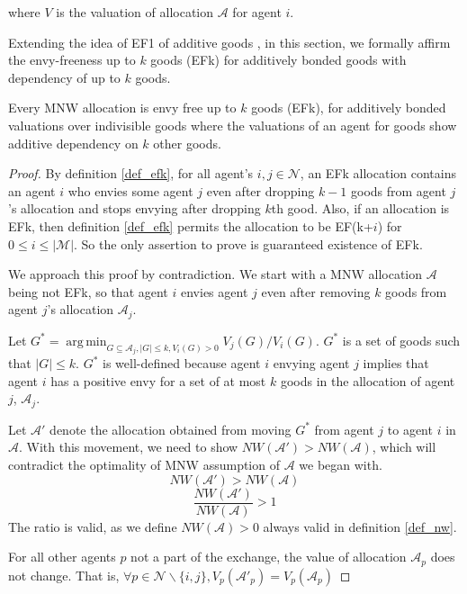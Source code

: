 where $V$ is the valuation of allocation $\mathcal{A}$ for agent $i$. 

Extending the idea of EF1 of additive goods \cite{caragiannis2016unreasonable}, in this section, we formally affirm the envy-freeness up to $k$ goods (EFk) for additively bonded goods with dependency of up to $k$ goods.

\begin{theorem}
Every MNW allocation is envy free up to $k$ goods (EFk), for additively bonded valuations over indivisible goods where the valuations of an agent for goods show additive dependency on $k$ other goods.
\end{theorem}

\begin{proof}
By definition \ref{def_efk}, for all agent's $i, j \in \mathcal{N}$, an EFk allocation contains an agent $i$ who envies some agent $j$ even after dropping $k-1$ goods from agent $j$'s allocation and stops envying after dropping $k$th good. Also, if an allocation is EFk, then definition \ref{def_efk} permits the allocation to be EF(k+$i$) for $0 \leq i \leq |\mathcal{M}|$. So the only assertion to prove is guaranteed existence of EFk.

We approach this proof by contradiction. We start with a MNW allocation $\mathcal{A}$ being not EFk, so that agent $i$ envies agent $j$ even after removing $k$ goods from agent $j$'s allocation $\mathcal{A}_j$.

Let $G^* = \operatorname{arg\,min}_{G \subseteq \mathcal{A}_j, |G| \leq k, V_i(G)>0} V_j(G)/V_i(G)$. $G^*$ is a set of goods such that $|G| \leq k$. $G^*$ is well-defined because agent $i$ envying agent $j$ implies that agent $i$ has a positive envy for a set of at most $k$ goods in the allocation of agent $j$, $\mathcal{A}_j$. 

Let $\mathcal{A}'$ denote the allocation obtained from moving $G^*$ from agent $j$ to agent $i$ in $\mathcal{A}$. With this movement, we need to show $NW(\mathcal{A}') > NW(\mathcal{A})$, which will contradict the optimality of MNW assumption of $\mathcal{A}$ we began with.
$$
    NW(\mathcal{A}') > NW(\mathcal{A})
$$
$$
    \frac{NW(\mathcal{A}')}{NW(\mathcal{A})} > 1
$$
The ratio is valid, as we define $NW(\mathcal{A}) > 0$ always valid in definition \ref{def_nw}.

For all other agents $p$ not a part of the exchange, the value of allocation $\mathcal{A}_p$ does not change. That is, $\forall p \in \mathcal{N}\backslash\{i,j\}, V_p(\mathcal{A}'_p) = V_p(\mathcal{A}_p)$


\end{proof}
